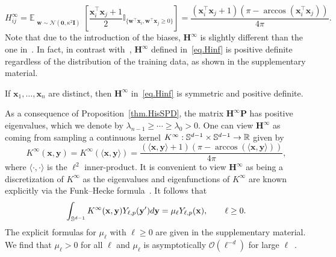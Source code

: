 \documentclass{article} %
\begin{document}
\begin{equation}\label{eq.Hinf}
    H^\infty_{ij} = \mathbb{E}_{\substack{\mathbf{w} \sim \mathcal{N}(\mathbf{0},\kappa^2\mathbf{I})}}\left[\frac{{\mathbf{x}}_i^\top{\mathbf{x}}_j + 1}{2} \mathbb{I}_{\{\mathbf{w}^\top \mathbf{x}_i, \mathbf{w}^\top \mathbf{x}_j \geq 0\}}\right] = \frac{({\mathbf{x}}_i^\top {\mathbf{x}}_j + 1) (\pi - \arccos(\mathbf{x}_i^\top \mathbf{x}_j))}{4\pi}.
\end{equation}
Note that due to the introduction of the biases, $\mathbf{H}^\infty$ is slightly different than the one in~\citep{du,arora}. In fact, in contrast with~\citep{du}, $\mathbf{H}^\infty$ defined in~\cref{eq.Hinf} is positive definite regardless of the distribution of the training data, as shown in the supplementary material.
\begin{prop}\label{thm.HisSPD}
If $\mathbf{x}_1, \ldots, \mathbf{x}_n$ are distinct, then $\mathbf{H}^\infty$ in~\cref{eq.Hinf} is symmetric and positive definite.
\end{prop}
As a consequence of Proposition~\ref{thm.HisSPD}, the matrix $\mathbf{H}^\infty \mathbf{P}$ has positive eigenvalues, which we denote by $\lambda_{n-1} \geq \cdots \geq \lambda_0 > 0$. One can view $\mathbf{H}^\infty$ as coming from sampling a continuous kernel ${K}^\infty: {\mathbb{S}}^{d-1} \times {\mathbb{S}}^{d-1} \rightarrow \mathbb{R}$ given by
\begin{equation}
    {K}^\infty(\mathbf{x}, \mathbf{y}) = {K}^\infty(\langle \mathbf{x},\mathbf{y}\rangle) = \frac{(\langle \mathbf{x},\mathbf{y}\rangle + 1) (\pi - \arccos(\langle \mathbf{x},\mathbf{y}\rangle))}{4\pi},
    \label{eq:Keigenvalues}
\end{equation}
where $\langle \cdot,\cdot\rangle$ is the $\ell^2$ inner-product. It is convenient to view $\mathbf{H}^\infty$ as being a discretization of ${K}^\infty$ as the eigenvalues and eigenfunctions of ${K}^\infty$ are known explicitly via the Funk--Hecke formula~\citep{basri}. It follows that
\begin{equation}\label{eq:Keigenvalues2}
    \int_{{\mathbb{S}}^{d-1}} {K}^\infty(\mathbf{x},\mathbf{y}) Y_{\ell,p}(\mathbf{y}') d\mathbf{y} = \mu_\ell Y_{\ell,p}(\mathbf{x}), \qquad \ell\geq 0.
\end{equation}
The explicit formulas for $\mu_\ell$ with $\ell\geq 0$ are given in the supplementary material. We find that $\mu_\ell > 0$ for all $\ell$ and $\mu_\ell$ is asymptotically  $\mathcal{O}(\ell^{-d})$ for large $\ell$~\citep{basri,bietti2019inductive}.
\end{document}
